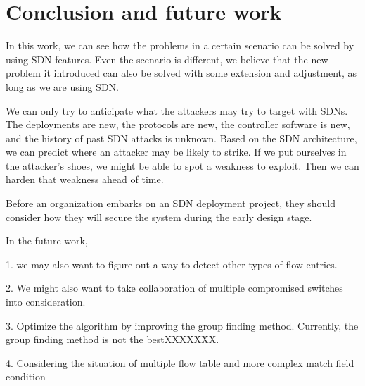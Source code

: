 \chapter{Conclusion and future work}
\label{conclusion}
In this work, we can see how the problems in a certain scenario can be solved by using SDN features. Even the scenario is different, we believe that the new problem it introduced can also be solved with some extension and adjustment, as long as we are using SDN.

We can only try to anticipate what the attackers may try to target with SDNs.  The deployments are new, the protocols are new, the controller software is new, and the history of past SDN attacks is unknown.  Based on the SDN architecture, we can predict where an attacker may be likely to strike.  If we put ourselves in the attacker’s shoes, we might be able to spot a weakness to exploit. Then we can harden that weakness ahead of time.

Before an organization embarks on an SDN deployment project, they should consider how they will secure the system during the early design stage. 

In the future work, 

1. we may also want to figure out a way to detect other types of flow entries.

2. We might also want to take collaboration of multiple compromised switches into consideration.

3. Optimize the algorithm by improving the group finding method. Currently, the group finding method is not the bestXXXXXXX.

4. Considering the situation of multiple flow table and more complex match field condition